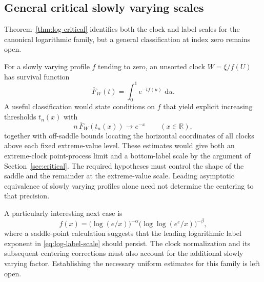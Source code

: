 \documentclass[11pt]{article}
\numberwithin{equation}{section}
\theoremstyle{definition}
\theoremstyle{remark}
\newcommand{\R}{\mathbb R}
\newcommand{\dd}{\,\mathrm d}
\begin{document}
\subsection{General critical slowly varying scales}

Theorem~\ref{thm:log-critical} identifies both the clock and label scales
for the canonical logarithmic family, but a general classification at
index zero remains open.

For a slowly varying profile $f$ tending to zero, an unsorted clock
$W=\xi/f(U)$ has survival function
\[
  \overline F_W(t)=\int_0^1 e^{-t f(u)}\,\dd u.
\]
A useful classification would state conditions on $f$ that yield
explicit increasing thresholds $t_n(x)$ with
\[
 n\,\overline F_W(t_n(x))\longrightarrow e^{-x}
 \qquad(x\in\R),
\]
together with off-saddle bounds locating the horizontal coordinates of
all clocks above each fixed extreme-value level.  These estimates would
give both an extreme-clock point-process limit and a bottom-label scale
by the argument of Section~\ref{sec:critical}.
The required hypotheses must control the shape of the saddle and the
remainder at the extreme-value scale.  Leading asymptotic equivalence
of slowly varying profiles alone need not determine the centering to
that precision.

A particularly interesting next case is
\[
  f(x)=\bigl(\log(e/x)\bigr)^{-\alpha}
       \bigl(\log\log(e^e/x)\bigr)^{-\beta},
\]
where a saddle-point calculation suggests that the leading logarithmic
label exponent in \eqref{eq:log-label-scale} should persist.  The clock
normalization and its subsequent centering corrections must also
account for the additional slowly varying factor.  Establishing the
necessary uniform estimates for this family is left open.
\end{document}
